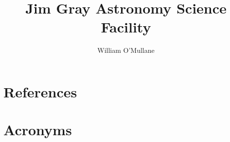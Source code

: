 \documentclass[DM,lsstdraft,authoryear,toc]{lsstdoc}
\title{Jim Gray Astronomy Science Facility}
\author{%
William O'Mullane
}
\date{\vcsDate}
\begin{document}
\maketitle


\appendix
\section{References} \label{sec:bib}
\renewcommand{\refname}{} %


\section{Acronyms} \label{sec:acronyms}

\end{document}
